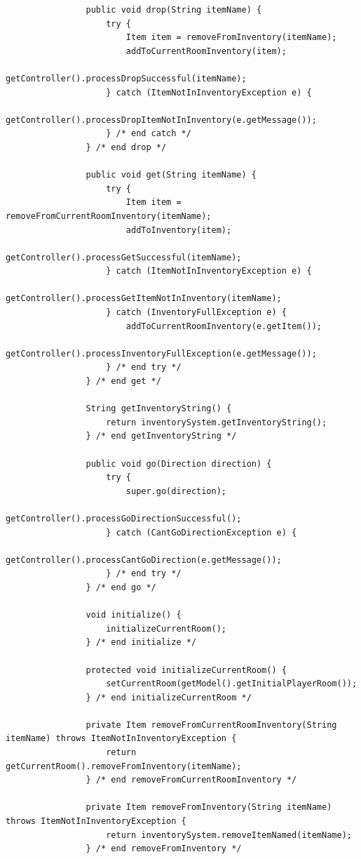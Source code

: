 \documentclass[a4paper, 11pt]{article}
\begin{document}
\begin{lstlisting}
                public void drop(String itemName) {
                    try {
                        Item item = removeFromInventory(itemName);
                        addToCurrentRoomInventory(item);
                        getController().processDropSuccessful(itemName);
                    } catch (ItemNotInInventoryException e) {
                        getController().processDropItemNotInInventory(e.getMessage());
                    } /* end catch */
                } /* end drop */

                public void get(String itemName) {
                    try {
                        Item item = removeFromCurrentRoomInventory(itemName);
                        addToInventory(item);
                        getController().processGetSuccessful(itemName);
                    } catch (ItemNotInInventoryException e) {
                        getController().processGetItemNotInInventory(itemName);
                    } catch (InventoryFullException e) {
                        addToCurrentRoomInventory(e.getItem());
                        getController().processInventoryFullException(e.getMessage());
                    } /* end try */
                } /* end get */

                String getInventoryString() {
                    return inventorySystem.getInventoryString();
                } /* end getInventoryString */

                public void go(Direction direction) {
                    try {
                        super.go(direction);
                        getController().processGoDirectionSuccessful();
                    } catch (CantGoDirectionException e) {
                        getController().processCantGoDirection(e.getMessage());
                    } /* end try */
                } /* end go */

                void initialize() {
                    initializeCurrentRoom();
                } /* end initialize */

                protected void initializeCurrentRoom() {
                    setCurrentRoom(getModel().getInitialPlayerRoom());
                } /* end initializeCurrentRoom */

                private Item removeFromCurrentRoomInventory(String itemName) throws ItemNotInInventoryException {
                    return getCurrentRoom().removeFromInventory(itemName);
                } /* end removeFromCurrentRoomInventory */

                private Item removeFromInventory(String itemName) throws ItemNotInInventoryException {
                    return inventorySystem.removeItemNamed(itemName);
                } /* end removeFromInventory */


\end{lstlisting}
\end{document}
